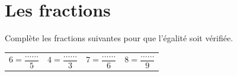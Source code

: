 \documentclass[a4paper,10pt]{report}
\begin{document}

\newpage
\section*{Les fractions}

\begin{ex}
Complète les fractions suivantes pour que l'égalité soit vérifiée.

\bigskip
\begin{enumerate}
\begin{tabular}{m{4cm}m{4cm}m{4cm}m{4cm}}
\item $6=\dfrac{\dots \dots}{5}$&
\item $4=\dfrac{\dots \dots}{3}$&
\item $7=\dfrac{\dots \dots}{6}$&
\item $8=\dfrac{\dots \dots}{9}$\\
\end{tabular}
\end{enumerate}
\end{ex}
\end{document}
